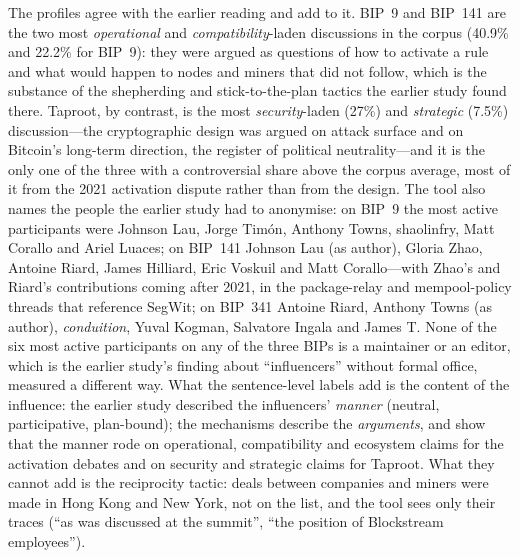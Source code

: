 The profiles agree with the earlier reading and add to it. BIP~9 and BIP~141 are the two most \emph{operational} and \emph{compatibility}-laden discussions in the corpus (40.9\% and 22.2\% for BIP~9): they were argued as questions of how to activate a rule and what would happen to nodes and miners that did not follow, which is the substance of the shepherding and stick-to-the-plan tactics the earlier study found there. Taproot, by contrast, is the most \emph{security}-laden (27\%) and \emph{strategic} (7.5\%) discussion---the cryptographic design was argued on attack surface and on Bitcoin's long-term direction, the register of political neutrality---and it is the only one of the three with a controversial share above the corpus average, most of it from the 2021 activation dispute rather than from the design. The tool also names the people the earlier study had to anonymise: on BIP~9 the most active participants were Johnson Lau, Jorge Tim\'on, Anthony Towns, shaolinfry, Matt Corallo and Ariel Luaces; on BIP~141 Johnson Lau (as author), Gloria Zhao, Antoine Riard, James Hilliard, Eric Voskuil and Matt Corallo---with Zhao's and Riard's contributions coming after 2021, in the package-relay and mempool-policy threads that reference SegWit; on BIP~341 Antoine Riard, Anthony Towns (as author), \emph{conduition}, Yuval Kogman, Salvatore Ingala and James T. None of the six most active participants on any of the three BIPs is a maintainer or an editor, which is the earlier study's finding about ``influencers'' without formal office, measured a different way. What the sentence-level labels add is the content of the influence: the earlier study described the influencers' \emph{manner} (neutral, participative, plan-bound); the mechanisms describe the \emph{arguments}, and show that the manner rode on operational, compatibility and ecosystem claims for the activation debates and on security and strategic claims for Taproot. What they cannot add is the reciprocity tactic: deals between companies and miners were made in Hong Kong and New York, not on the list, and the tool sees only their traces (``as was discussed at the summit'', ``the position of Blockstream employees'').

